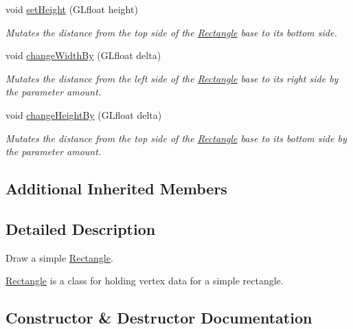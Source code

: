 \begin{DoxyCompactItemize}
void \hyperlink{classtsgl_1_1_rectangle_aa875690bd21ba3a9ca373d38807ccbdc}{set\+Height} (G\+Lfloat height)
\begin{DoxyCompactList}\small\item\em Mutates the distance from the top side of the \hyperlink{classtsgl_1_1_rectangle}{Rectangle} base to its bottom side. \end{DoxyCompactList}\item 
void \hyperlink{classtsgl_1_1_rectangle_aa0114936bf85578502866ab51df1232f}{change\+Width\+By} (G\+Lfloat delta)
\begin{DoxyCompactList}\small\item\em Mutates the distance from the left side of the \hyperlink{classtsgl_1_1_rectangle}{Rectangle} base to its right side by the parameter amount. \end{DoxyCompactList}\item 
void \hyperlink{classtsgl_1_1_rectangle_a22ef2c95953f9083334f95e406ff6800}{change\+Height\+By} (G\+Lfloat delta)
\begin{DoxyCompactList}\small\item\em Mutates the distance from the top side of the \hyperlink{classtsgl_1_1_rectangle}{Rectangle} base to its bottom side by the parameter amount. \end{DoxyCompactList}\end{DoxyCompactItemize}
\subsection*{Additional Inherited Members}


\subsection{Detailed Description}
Draw a simple \hyperlink{classtsgl_1_1_rectangle}{Rectangle}. 

\hyperlink{classtsgl_1_1_rectangle}{Rectangle} is a class for holding vertex data for a simple rectangle. 

\subsection{Constructor \& Destructor Documentation}
\mbox{\label{classtsgl_1_1_rectangle_a9b33adc9b27c1e943d30c1730ed45fab}} 
